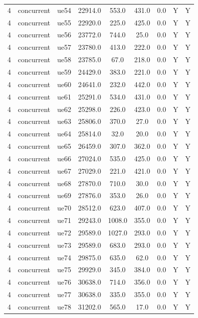 \begin{table}[ht]
\begin{tabular}{|c|c|c|c|c|c|c|c|c|}
4 & concurrent & ue54 & 22914.0 & 553.0 & 431.0 & 0.0 & Y & Y \\
4 & concurrent & ue55 & 22920.0 & 225.0 & 425.0 & 0.0 & Y & Y \\
4 & concurrent & ue56 & 23772.0 & 744.0 & 25.0 & 0.0 & Y & Y \\
4 & concurrent & ue57 & 23780.0 & 413.0 & 222.0 & 0.0 & Y & Y \\
4 & concurrent & ue58 & 23785.0 & 67.0 & 218.0 & 0.0 & Y & Y \\
4 & concurrent & ue59 & 24429.0 & 383.0 & 221.0 & 0.0 & Y & Y \\
4 & concurrent & ue60 & 24641.0 & 232.0 & 442.0 & 0.0 & Y & Y \\
4 & concurrent & ue61 & 25291.0 & 534.0 & 431.0 & 0.0 & Y & Y \\
4 & concurrent & ue62 & 25298.0 & 226.0 & 423.0 & 0.0 & Y & Y \\
4 & concurrent & ue63 & 25806.0 & 370.0 & 27.0 & 0.0 & Y & Y \\
4 & concurrent & ue64 & 25814.0 & 32.0 & 20.0 & 0.0 & Y & Y \\
4 & concurrent & ue65 & 26459.0 & 307.0 & 362.0 & 0.0 & Y & Y \\
4 & concurrent & ue66 & 27024.0 & 535.0 & 425.0 & 0.0 & Y & Y \\
4 & concurrent & ue67 & 27029.0 & 221.0 & 421.0 & 0.0 & Y & Y \\
4 & concurrent & ue68 & 27870.0 & 710.0 & 30.0 & 0.0 & Y & Y \\
4 & concurrent & ue69 & 27876.0 & 353.0 & 26.0 & 0.0 & Y & Y \\
4 & concurrent & ue70 & 28512.0 & 623.0 & 407.0 & 0.0 & Y & Y \\
4 & concurrent & ue71 & 29243.0 & 1008.0 & 355.0 & 0.0 & Y & Y \\
4 & concurrent & ue72 & 29589.0 & 1027.0 & 293.0 & 0.0 & Y & Y \\
4 & concurrent & ue73 & 29589.0 & 683.0 & 293.0 & 0.0 & Y & Y \\
4 & concurrent & ue74 & 29875.0 & 635.0 & 62.0 & 0.0 & Y & Y \\
4 & concurrent & ue75 & 29929.0 & 345.0 & 384.0 & 0.0 & Y & Y \\
4 & concurrent & ue76 & 30638.0 & 714.0 & 356.0 & 0.0 & Y & Y \\
4 & concurrent & ue77 & 30638.0 & 335.0 & 355.0 & 0.0 & Y & Y \\
4 & concurrent & ue78 & 31202.0 & 565.0 & 17.0 & 0.0 & Y & Y \\

\end{tabular}
\end{table}
